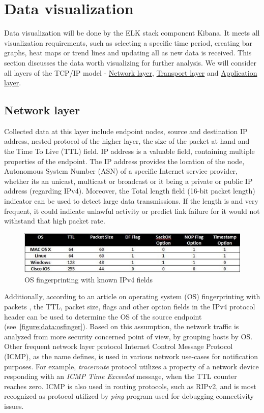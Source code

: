 \documentclass[12pt,a4paper,twoside]{report}
\begin{document}
	\section{Data visualization} \label{analysis:data}
		Data visualization will be done by the ELK stack component Kibana. It meets all visualization requirements, such as selecting a specific time period, creating bar graphs, heat maps or trend lines and updating all as new data is received. This section discusses the data worth visualizing for further analysis. We will consider all layers of the TCP/IP model - \hyperref[analysis:data:network]{Network layer}, \hyperref[analysis:data:transport]{Transport layer} and \hyperref[analysis:data:application]{Application layer}.
		\subsection{Network layer} \label{analysis:data:network}
			Collected data at this layer include endpoint nodes, source and destination IP address, nested protocol of the higher layer, the size of the packet at hand and the Time To Live (TTL) field. IP address is a valuable field, containing multiple properties of the endpoint. The IP address provides the location of the node, Autonomous System Number (ASN) of a specific Internet service provider, whether its an unicast, multicast or broadcast or it being a private or public IP address (regarding IPv4). Moreover, the Total length field (16-bit packet length) indicator can be used to detect large data transmissions. If the length is and very frequent, it could indicate unlawful activity or predict link failure for it would not withstand that high packet rate.\par
			\begin{figure}[h]
				\centering
				\includegraphics[scale=0.7]{osfingerprinting}
				\caption{OS fingerprinting with known IPv4 fields}
				\label{figure:data:osfinger}
			\end{figure}
			Additionally, according to an article on operating system (OS) fingerprinting with packets \cite{web:osfinger}, the TTL, packet size, flags and other option fields in the IPv4 protocol header can be used to determine the OS of the source endpoint (see~\autoref{figure:data:osfinger}). Based on this assumption, the network traffic is analyzed from more security concerned point of view, by grouping hosts by OS.
			Other frequent network layer protocol Internet Control Message Protocol (ICMP), as the name defines, is used in various network use-cases for notification purposes. For example, \emph{traceroute} protocol utilizes a property of a network device responding with an \emph{ICMP Time Exceeded} message, when the TTL counter reaches zero. ICMP is also used in routing protocols, such as RIPv2, and is most recognized as protocol utilized by \emph{ping} program used for debugging connectivity issues.
\end{document}

